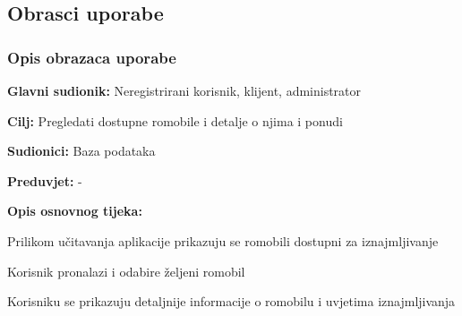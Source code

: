 			\eject 
			
			
				
			\subsection{Obrasci uporabe}
				
			
				
				\subsubsection{Opis obrazaca uporabe}
					
					
					\noindent {}
					\begin{packed_item}
	
						\item \textbf{Glavni sudionik: }Neregistrirani korisnik, klijent, administrator 
						\item  \textbf{Cilj:} Pregledati dostupne romobile i detalje o njima i ponudi
						\item  \textbf{Sudionici:} Baza podataka
						\item  \textbf{Preduvjet:} -
						\item  \textbf{Opis osnovnog tijeka:}
						
						\item[] \begin{packed_enum}
	
							\item Prilikom učitavanja aplikacije prikazuju se romobili dostupni za iznajmljivanje
							\item Korisnik pronalazi i odabire željeni romobil
							\item Korisniku se prikazuju detaljnije informacije o romobilu i uvjetima iznajmljivanja
						
						\end{packed_enum}
					\end{packed_item}
						
